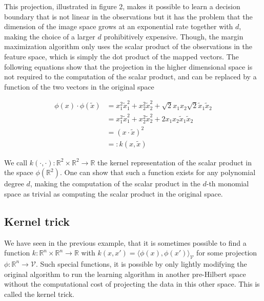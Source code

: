 This projection, illustrated in figure 2, makes it possible to learn a decision boundary that is not linear in the observations but it has the problem that the dimension of the image space grows at an exponential rate together with $d$, making the choice of a larger $d$ prohibitively expensive. Though, the margin maximization algorithm only uses the scalar product of the observations in the feature space, which is simply the dot product of the mapped vectors. The following equations show that the projection in the higher dimensional space is not required to the computation of the scalar product, and can be replaced by a function of the two vectors in the original space

\begin{equation*}
  \begin{aligned}
    \phi(x) \cdot \phi(\tilde{x})
    &= x_1^2\tilde{x}_1^2 + x_2^2\tilde{x}_2^2 + \sqrt{2}x_1x_2\sqrt{2}\tilde{x}_1\tilde{x}_2\\
    &= x_1^2\tilde{x}_1^2 + x_2^2\tilde{x}_2^2 + 2x_1x_2\tilde{x}_1\tilde{x}_2\\
    &= \left(x \cdot \tilde{x}\right)^2 \\
    &=: k(x, \tilde{x})
  \end{aligned}
\end{equation*}

We call $k(\cdot, \cdot) : \mathbb{R}^2 \times \mathbb{R}^2 \rightarrow \mathbb{R}$ the kernel representation of the scalar product in the space $\phi(\mathbb{R}^2)$. One can show that such a function exists for any polynomial degree $d$, making the computation of the scalar product in the $d$-th monomial space as trivial as computing the scalar product in the original space.

\subsection{Kernel trick}

We have seen in the previous example, that it is sometimes possible to find a function $k :\mathbb{R}^n \times \mathbb{R}^n \rightarrow \mathbb{R}$ with $k(x, x') = \langle \phi(x), \phi(x')\rangle _{\mathcal{V}}$ for some projection $\phi : \mathbb{R}^n \rightarrow \mathcal{V}$. Such special functions, it is possible by only lightly modifying the original algorithm to run the learning algorithm in another pre-Hilbert space without the computational cost of projecting the data in this other space. This is called the kernel trick.

